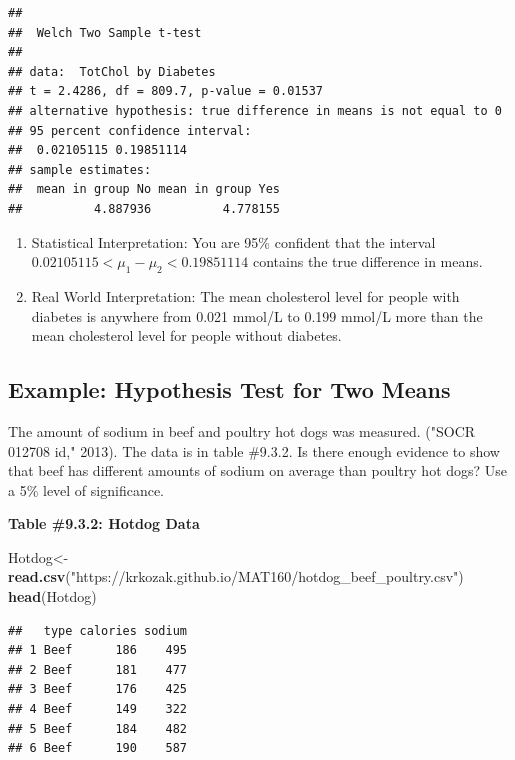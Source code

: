 \documentclass[]{book}
\newenvironment{Shaded}{\begin{snugshade}}{\end{snugshade}}
\newcommand{\KeywordTok}[1]{\textcolor[rgb]{0.13,0.29,0.53}{\textbf{#1}}}
\newcommand{\NormalTok}[1]{#1}
\newcommand{\StringTok}[1]{\textcolor[rgb]{0.31,0.60,0.02}{#1}}
\begin{document}
\begin{verbatim}
## 
##  Welch Two Sample t-test
## 
## data:  TotChol by Diabetes
## t = 2.4286, df = 809.7, p-value = 0.01537
## alternative hypothesis: true difference in means is not equal to 0
## 95 percent confidence interval:
##  0.02105115 0.19851114
## sample estimates:
##  mean in group No mean in group Yes 
##          4.887936          4.778155
\end{verbatim}

\begin{enumerate}
\def\labelenumi{\arabic{enumi}.}
\setcounter{enumi}{3}
\item
  Statistical Interpretation: You are 95\% confident that the interval \(0.02105115<\mu_1-\mu_2<0.19851114\) contains the true difference in means.
\item
  Real World Interpretation: The mean cholesterol level for people with diabetes is anywhere from 0.021 mmol/L to 0.199 mmol/L more than the mean cholesterol level for people without diabetes.
\end{enumerate}

\hypertarget{example-hypothesis-test-for-two-means-1}{%
\subsection{Example: Hypothesis Test for Two Means}\label{example-hypothesis-test-for-two-means-1}}

The amount of sodium in beef and poultry hot dogs was measured. ("SOCR 012708 id," 2013). The data is in table \#9.3.2. Is there enough evidence to show that beef has different amounts of sodium on average than poultry hot dogs? Use a 5\% level of significance.

\textbf{Table \#9.3.2: Hotdog Data}

\begin{Shaded}
\begin{Highlighting}[]
\NormalTok{Hotdog<-}\KeywordTok{read.csv}\NormalTok{(}\StringTok{"https://krkozak.github.io/MAT160/hotdog_beef_poultry.csv"}\NormalTok{)}
\KeywordTok{head}\NormalTok{(Hotdog)}
\end{Highlighting}
\end{Shaded}

\begin{verbatim}
##   type calories sodium
## 1 Beef      186    495
## 2 Beef      181    477
## 3 Beef      176    425
## 4 Beef      149    322
## 5 Beef      184    482
## 6 Beef      190    587
\end{verbatim}
\end{document}
